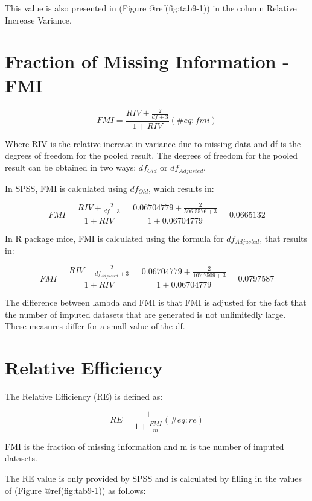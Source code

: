 \documentclass[
]{book}
\begin{document}
This value is also presented in (Figure @ref(fig:tab9-1)) in the column
Relative Increase Variance.

\hypertarget{fraction-of-missing-information---fmi}{%
\section{Fraction of Missing Information -
FMI}\label{fraction-of-missing-information---fmi}}

\begin{equation}
FMI = \frac{RIV + \frac{2}{df+3}}{1+RIV}
  (\#eq:fmi)
\end{equation}

Where RIV is the relative increase in variance due to missing data and
df is the degrees of freedom for the pooled result. The degrees of
freedom for the pooled result can be obtained in two ways:
\({df_{Old}}\) or \({df_{Adjusted}}\).

In SPSS, FMI is calculated using \({df_{Old}}\), which results in:

\[FMI = \frac{RIV + \frac{2}{df+3}}{1+RIV}=\frac{0.06704779 + \frac{2}{506.5576+3}}{1+0.06704779}=0.0665132\]

In R package mice, FMI is calculated using the formula for
\({df_{Adjusted}}\), that results in:

\[FMI = \frac{RIV + \frac{2}{df_{Adjusted}+3}}{1+RIV}=\frac{0.06704779 + \frac{2}{107.7509+3}}{1+0.06704779}=0.0797587\]

The difference between lambda and FMI is that FMI is adjusted for the
fact that the number of imputed datasets that are generated is not
unlimitedly large. These measures differ for a small value of the df.

\hypertarget{relative-efficiency}{%
\section{Relative Efficiency}\label{relative-efficiency}}

The Relative Efficiency (RE) is defined as:

\begin{equation}
RE = \frac{1}{1+\frac{FMI}{m}}
  (\#eq:re)
\end{equation}

FMI is the fraction of missing information and m is the number of
imputed datasets.

The RE value is only provided by SPSS and is calculated by filling in
the values of (Figure @ref(fig:tab9-1)) as follows:
\end{document}
